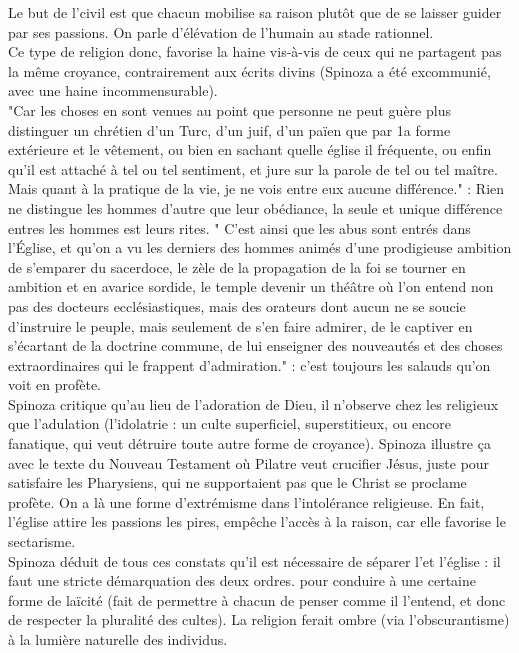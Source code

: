 \documentclass[a4paper,12pt]{article}
\begin{document}
Le but de l'\etat civil est que chacun mobilise sa raison plutôt que de se laisser guider par ses passions. On parle d'élévation de l'humain au stade rationnel.\\
Ce type de religion donc, favorise la haine vis-à-vis de ceux qui ne partagent pas la même croyance, contrairement aux écrits divins (Spinoza a été excommunié, avec une haine incommensurable).\\
"Car les choses en sont venues au point que personne ne peut guère plus distinguer un chrétien d’un Turc, d’un juif, d’un païen que par 1a forme extérieure et le vêtement, ou bien en sachant quelle église il fréquente, ou enfin qu’il est attaché à tel ou tel sentiment, et jure sur la parole de tel ou tel maître. Mais quant à la pratique de la vie, je ne vois entre eux aucune différence." : Rien ne distingue les hommes d'autre que leur obédiance, la seule et unique différence entres les hommes est leurs rites.\n
" C’est ainsi que les abus sont entrés dans l’Église, et qu’on a vu les derniers des hommes animés d’une prodigieuse ambition de s’emparer du sacerdoce, le zèle de la propagation de la foi se tourner en ambition et en avarice sordide, le temple devenir un théâtre où l’on entend non pas des docteurs ecclésiastiques, mais des orateurs dont aucun ne se soucie d’instruire le peuple, mais seulement de s’en faire admirer, de le captiver en s’écartant de la doctrine commune, de lui enseigner des nouveautés et des choses extraordinaires qui le frappent d’admiration." : c'est toujours les salauds qu'on voit en profète.\\
Spinoza critique qu'au lieu de l'adoration de Dieu, il n'observe chez les religieux que l'adulation (l'idolatrie : un culte superficiel, superstitieux, ou encore fanatique, qui veut détruire toute autre forme de croyance). Spinoza illustre ça avec le texte du Nouveau Testament où Pilatre veut crucifier Jésus, juste pour satisfaire les Pharysiens, qui ne supportaient pas que le Christ se proclame profète. On a là une forme d'extrémisme dans l'intolérance religieuse. En fait, l'église attire les passions les pires, empêche l'accès à la raison, car elle favorise le sectarisme.\\
Spinoza déduit de tous ces constats qu'il est nécessaire de séparer l'\etat et l'église : il faut une stricte démarquation des deux ordres. pour conduire à une certaine forme de laïcité (fait de permettre à chacun de penser comme il l'entend, et donc de respecter la pluralité des cultes). La religion ferait ombre (via l'obscurantisme) à la lumière naturelle des individus.\\\\
\end{document}
